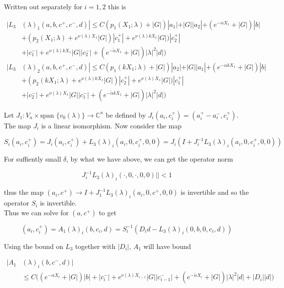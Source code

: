 \documentclass[12pt]{article}
\def\C{{\mathbb C}}
\begin{document}
\begin{enumerate}
Written out separately for $i = 1, 2$ this is 

\begin{align*}
|L_3&(\lambda)_1(a, b, c^+, c^-, d)| \leq C (p_1(X_1; \lambda) + |G|)|a_1| + |G||a_2| + (e^{-\alpha X_1} + |G|) |b|\\
&+ ( p_2(X_1; \lambda) + e^{\nu(\lambda)X_1} |G|) |c_1^+| + e^{\nu(\lambda) k X_1} |G|) |c_2^+|\\
&+ |c_1^-| + e^{\nu(\lambda)k X_1} |G||c_2^-| + (e^{-\tilde{\alpha} X_1} + |G|) |\lambda|^2 |d| ) \\
|L_3&(\lambda)_2(a, b, c^+, c^-, d)| \leq C (p_1(k X_1; \lambda) + |G|)|a_2| + |G||a_1| + (e^{-\alpha k X_1} + |G|) |b| \\
&+ ( p_2(k X_1; \lambda) + e^{\nu(\lambda)k X_1} |G|) |c_2^+| + e^{\nu(\lambda)X_1} |G|) |c_1^+|\\
&+ |c_2^-| + e^{\nu(\lambda)X_1} |G||c_1^-| + (e^{-\tilde{\alpha} k X_1} + |G|) |\lambda|^2 |d| )
\end{align*}

Let $J_1: V_a \times \text{span }\{v_0(\lambda)\} \rightarrow \C^n$ be defined by $J_i(a_i, c_i^+) = (a_i^+ - a_i^-, c_i^+)$. The map $J_i$ is a linear isomorphism. Now consider the map

\[
S_i(a_i, c_i^+) = J_i (a_i, c_i^+) + L_3(\lambda)_i(a_i, 0, c_i^+, 0, 0) = J_i( I + J_i^{-1} L_3(\lambda)_i(a_i, 0, c_i^+, 0, 0))
\]

For suffiently small $\delta$, by what we have above, we can get the operator norm 

\[
J_i^{-1} L_3(\lambda)_i(\cdot, 0, \cdot, 0, 0)|| < 1
\]

thus the map $(a_i, c^+) \rightarrow I + J_1^{-1} L_3(\lambda)_i(a_i, 0, c^+, 0, 0)$ is invertible and so the operator $S_i$ is invertible.\\

Thus we can solve for $(a, c^+)$ to get

\[
(a_i, c_i^+) = A_1(\lambda)_i(b, c_i, d) = S_i^{-1}(D_i d - L_3(\lambda)_i(0, b, 0, c_i, d))
\]

Using the bound on $L_3$ together with $|D_i|$, $A_1$ will have bound

\begin{align*}
|A_1&(\lambda)_i(b, c^-, d)| \\
&\leq C \Big( (e^{-\alpha X_i} + |G|) |b| 
+ |c_i^-| + e^{\nu(\lambda)X_{i-1}} |G||c_{i-1}^-| + (e^{-\tilde{\alpha} X_i} + |G|) |\lambda|^2 |d| + |D_i||d| \Big)
\end{align*} 


\end{enumerate}
\end{document}
